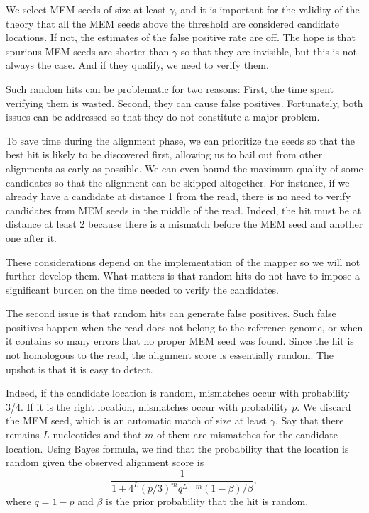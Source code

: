 \documentclass{article}
\begin{document}
We select MEM seeds of size at least $\gamma$, and it is important for the
validity of the theory that all the MEM seeds above the threshold are
considered candidate locations. If not, the estimates of the false
positive rate are off. The hope is that spurious MEM seeds are shorter
than $\gamma$ so that they are invisible, but this is not always the case.
And if they qualify, we need to verify them.

Such random hits can be problematic for two reasons: First, the time spent
verifying them is wasted. Second, they can cause false positives.
Fortunately, both issues can be addressed so that they do not constitute a
major problem.

To save time during the alignment phase, we can prioritize the seeds so
that the best hit is likely to be discovered first, allowing us to bail
out from other alignments as early as possible. We can even bound
the maximum quality of some candidates so that the alignment can be
skipped altogether. For instance, if we already have a candidate at
distance 1 from the read, there is no need to verify candidates from MEM
seeds in the middle of the read. Indeed, the hit must be at distance at
least 2 because there is a mismatch before the MEM seed and another one
after it.

These considerations depend on the implementation of the mapper so we will
not further develop them. What matters is that random hits do not have to
impose a significant burden on the time needed to verify the candidates.

The second issue is that random hits can generate false positives. Such
false positives happen when the read does not belong to the reference
genome, or when it contains so many errors that no proper MEM seed was
found. Since the hit is not homologous to the read, the alignment score is
essentially random. The upshot is that it is easy to detect.

Indeed, if the candidate location is random, mismatches occur with
probability 3/4. If it is the right location, mismatches occur with
probability $p$. We discard the MEM seed, which is an automatic match of
size at least $\gamma$. Say that there remains $L$ nucleotides and that
$m$ of them are mismatches for the candidate location. Using Bayes
formula, we find that the probability that the location is random given
the observed alignment score is
\begin{equation}
\label{eq:bayes}
\frac{1}{1 + 4^L(p/3)^mq^{L-m}(1-\beta)/\beta},
\end{equation}
where $q=1-p$ and $\beta$ is the prior probability that the hit is
random.
\end{document}
